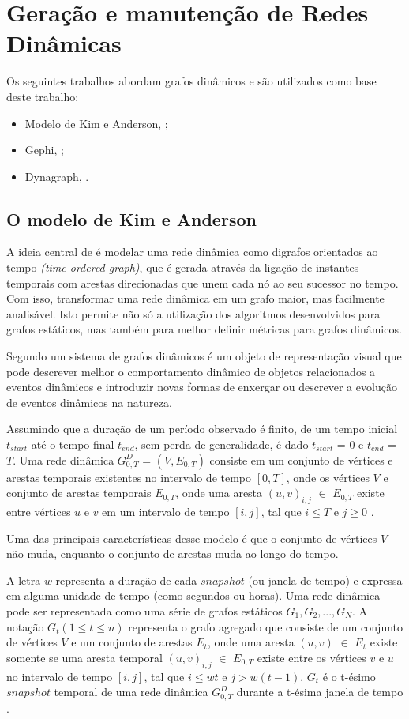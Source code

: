 \section{Geração e manutenção de Redes Dinâmicas}
Os seguintes trabalhos abordam grafos dinâmicos e são utilizados como base deste trabalho:
\begin{itemize}
\item Modelo de Kim e Anderson, \cite{kim};
\item Gephi, \cite{gephi};
\item Dynagraph, \cite{dynagraph}.
\end{itemize}


\subsection{O modelo de Kim e Anderson}
A ideia central de \cite{kim} é modelar uma rede dinâmica como digrafos orientados
ao tempo \textit{(time-ordered graph)}, que é gerada através da ligação de instantes temporais com arestas
direcionadas que unem cada nó ao seu sucessor no tempo. Com isso, transformar uma rede dinâmica
em um grafo maior, mas facilmente analisável. Isto permite não só a utilização dos algoritmos
desenvolvidos para grafos estáticos, mas também para melhor definir métricas para
grafos dinâmicos.

Segundo \cite{kim} um sistema de grafos dinâmicos é um objeto de representação visual que pode descrever
melhor o comportamento dinâmico de objetos rela\-cio\-nados a eventos dinâmicos e introduzir
novas formas de enxergar ou descrever a evolução de eventos dinâmicos na natureza.

Assumindo que a duração de um período observado é finito, de um tempo inicial $t_{start}$ até o tempo final $t_{end}$, sem perda de
generalidade, é dado $t_{start}$ = $0$ e $t_{end}$ = $T$. Uma rede dinâmica $G^D_{0,T}$ = $(V, E_{0,T})$ consiste
em um conjunto de vértices e arestas temporais existentes no intervalo de tempo $[0,T]$, onde
os vértices $V$ e conjunto de arestas temporais $E_{0,T}$, onde uma aresta $(u,v)_{i,j}$ $\in$ $E_{0,T}$
existe entre vértices $u$ e $v$ em um intervalo de tempo $[i,j]$, tal que $i \leqslant T$ e $j \geqslant 0$ \cite{kim}.

Uma das principais características desse modelo é que o conjunto de vértices $V$ não muda,
enquanto o conjunto de arestas muda ao longo do tempo.

A letra $w$ representa a duração de cada $snapshot$ (ou janela de tempo) e expressa em alguma unidade de tempo (como segundos ou horas).
Uma rede dinâmica pode ser representada como uma série de grafos estáticos $G_1, G_2, ..., G_N$.
A notação $G_t(1 \leqslant t \leqslant n)$ representa o grafo agregado que consiste
de um conjunto de vértices $V$ e um conjunto de arestas $E_t$, onde uma aresta $(u,v)$ $\in$ $E_t$ existe
somente se uma aresta temporal $(u,v)_{i,j}$ $\in$ $E_{0,T}$ existe entre os vértices $v$ e $u$ no intervalo
de tempo $[i,j]$, tal que $i \leqslant wt$ e $j > w(t-1)$. $G_t$ é o t-ésimo $snapshot$ temporal de uma
rede dinâmica $G^D_{0,T}$ durante a t-ésima janela de tempo \cite{kim}.

